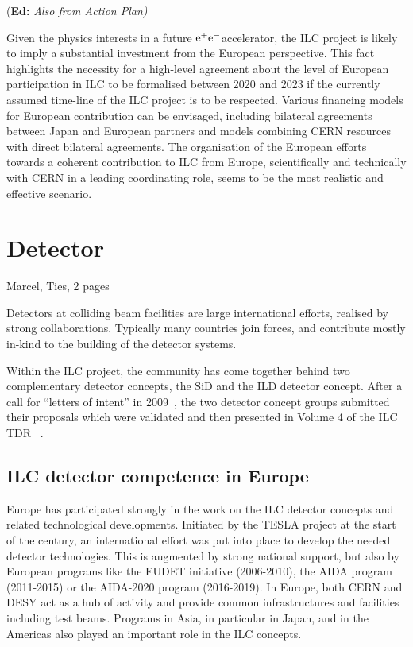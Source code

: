 \documentclass[%
 reprint,
 amsmath,amssymb,
 aps,
]{revtex4-1}
\newif\ifEdNotes \EdNotestrue
\newcommand{\doednote}[1]{{\color{red}(\textbf{Ed:} \textit{#1)}}}
\newcommand{\ednote}[1]{\ifEdNotes 
  \doednote{#1} 
\fi}
\newcommand{\epem}{\mbox{${\rm e}^+{\rm e}^-$}}
\begin{document}
\ednote{Also from Action Plan}
Given the physics interests in a future \epem accelerator, the ILC project is likely to imply a substantial investment from
the European perspective. This fact highlights the necessity for a high-level
agreement about the level of European participation in ILC to be formalised between 2020
and 2023 if the currently assumed time-line of the ILC project is to be respected. Various
financing models for European contribution can be envisaged, including bilateral agreements
between Japan and European partners and models combining CERN resources with direct bilateral
agreements. The organisation of the European efforts towards a coherent contribution to ILC
from Europe, scientifically and technically with CERN in a leading coordinating role, seems to be
the most realistic and effective scenario.


\section{\label{sec:det}Detector}
Marcel, Ties, 2 pages

Detectors at colliding beam facilities are large international efforts, realised by strong collaborations. 
Typically many countries join forces, and contribute mostly in-kind to the building of the detector systems. 

Within the ILC project, the community has come together behind two complementary detector concepts, the SiD and the ILD detector concept. 
After a call for ``letters of intent'' in 2009~\cite{Aihara:2009ad,Abe:2010aa}, the two detector concept groups submitted their proposals 
which were validated and then presented in Volume 4 of the ILC TDR ~\cite{Behnke:2013lya}.

\subsection{ILC detector competence in Europe~\label{sec:det:competence}}
Europe has participated strongly in the work on the ILC detector concepts and 
related technological developments. Initiated by the TESLA project at the start 
of the century, an international effort was put into place to develop the needed 
detector technologies. This is augmented by strong national support, but also by 
European programs like the EUDET initiative (2006-2010), the AIDA program 
(2011-2015) or the AIDA-2020 program (2016-2019). In Europe, both CERN and DESY 
act as a hub of activity and provide common infrastructures and facilities 
including test beams. Programs in Asia, in particular in Japan, and in the 
Americas also played an important role in the ILC concepts. 
\end{document}
